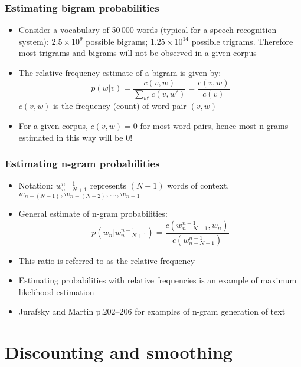 \begin{frame}
  \frametitle{Estimating bigram probabilities}
  \begin{itemize}
  \item<1-> Consider a vocabulary of 50\,000 words (typical for a speech
    recognition system): $2.5 \times 10^9$ possible bigrams; $1.25
    \times 10^{14}$ possible trigrams.  Therefore most trigrams and
    bigrams will not be observed in a given corpus 
  \item<2-> The relative frequency estimate of a bigram is given by:
    \[ p(w|v) = \frac{c(v,w)}{\sum_{w'}c(v,w')} = \frac{c(v,w)}{c(v)} \]
    $c(v,w)$ is the frequency (count) of word pair $(v,w)$
  \item<2-> For a given corpus,  $c(v,w) = 0$ for most word pairs, hence
    most n-grams estimated in this way will be 0!
  \end{itemize}
\end{frame}

\begin{frame}
  \frametitle{Estimating n-gram probabilities}

  \begin{itemize}
  \item<1-> Notation: $w_{n-N+1}^{n-1}$ represents $(N-1)$ words of
    context, $w_{n-(N-1)}, w_{n-(N-2)}, \ldots, w_{n-1}$
  \item<1-> General estimate of n-gram probabilities:
    \[ p(w_n | w_{n-N+1}^{n-1}) = \frac{c(w_{n-N+1}^{n-1},
      w_n)}{c(w_{n-N+1}^{n-1})} \]
  \item<2-> This ratio is referred to as the \alert{relative frequency}
  \item<2-> Estimating probabilities with relative frequencies is an
    example of \alert{maximum likelihood estimation}
  \item <3-> Jurafsky and Martin p.202--206 for examples of n-gram
    \alert{generation} of text 
  \end{itemize}
\end{frame}

\section{Discounting and smoothing}

